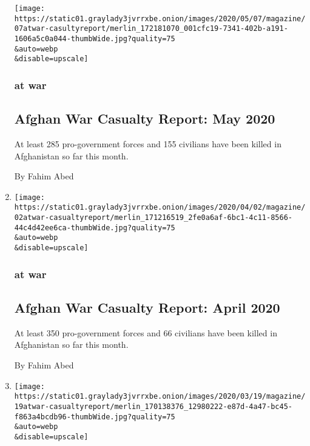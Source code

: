 \begin{enumerate}
  \texttt{[image: https://static01.graylady3jvrrxbe.onion/images/2020/05/07/magazine/07atwar-casultyreport/merlin\_172181070\_001cfc19-7341-402b-a191-1606a5c0a044-thumbWide.jpg?quality=75\\\&auto=webp\\\&disable=upscale]}

  \hypertarget{at-war-4}{%
  \subsubsection{at war}\label{at-war-4}}

  \hypertarget{afghan-war-casualty-report-may-2020}{%
  \subsection{Afghan War Casualty Report: May
  2020}\label{afghan-war-casualty-report-may-2020}}

  At least 285 pro-government forces and 155 civilians have been killed
  in Afghanistan so far this month.

  By Fahim Abed
\item
  \href{/2020/04/02/magazine/afghan-war-casualty-report-april-2020.html}{}

  \texttt{[image: https://static01.graylady3jvrrxbe.onion/images/2020/04/02/magazine/02atwar-casualtyreport/merlin\_171216519\_2fe0a6af-6bc1-4c11-8566-44c4d42ee6ca-thumbWide.jpg?quality=75\\\&auto=webp\\\&disable=upscale]}

  \hypertarget{at-war-5}{%
  \subsubsection{at war}\label{at-war-5}}

  \hypertarget{afghan-war-casualty-report-april-2020}{%
  \subsection{Afghan War Casualty Report: April
  2020}\label{afghan-war-casualty-report-april-2020}}

  At least 350 pro-government forces and 66 civilians have been killed
  in Afghanistan so far this month.

  By Fahim Abed
\item
  \href{/2020/03/05/magazine/afghan-war-casualty-report-march-2020.html}{}

  \texttt{[image: https://static01.graylady3jvrrxbe.onion/images/2020/03/19/magazine/19atwar-casualtyreport/merlin\_170138376\_12980222-e87d-4a47-bc45-f863a4bcdb96-thumbWide.jpg?quality=75\\\&auto=webp\\\&disable=upscale]}


\end{enumerate}
